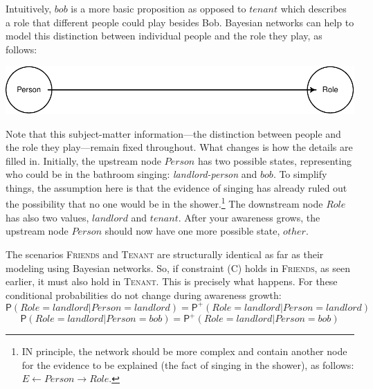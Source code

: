 \documentclass[
  11pt,
  dvipsnames,enabledeprecatedfontcommands]{scrartcl}
\newcommand{\pr}[1]{\ensuremath{\mathsf{P}(#1)}}
\newcommand{\ppr}[2]{\ensuremath{\mathsf{P}^{#1}(#2)}}
\begin{document}
Intuitively, \(bob\) is a more basic proposition as opposed to
\(tenant\) which describes a role that different people could play
besides Bob. Bayesian networks can help to model this distinction
between individual people and the role they play, as follows:

\begin{center}\includegraphics[width=0.5\linewidth,height=0.3\textheight]{ReplyToSteeleStefansson5_files/figure-latex/tenantsDAG-new-1} \end{center}

\noindent Note that this subject-matter information---the distinction
between people and the role they play---remain fixed throughout. What
changes is how the details are filled in. Initially, the upstream node
\(Person\) has two possible states, representing who could be in the
bathroom singing: \textit{landlord-person} and \(bob\). To simplify
things, the assumption here is that the evidence of singing has already
ruled out the possibility that no one would be in the shower.\footnote{IN
  principle, the network should be more complex and contain another node
  for the evidence to be explained (the fact of singing in the shower),
  as follows: \(E\leftarrow\textit{Person}\rightarrow \textit{Role}\).}
The downstream node \(Role\) has also two values, \(landlord\) and
\(tenant\). After your awareness grows, the upstream node \(Person\)
should now have one more possible state, \(other\).

The scenarios \textsc{Friends} and \textsc{Tenant} are structurally
identical as far as their modeling using Bayesian networks. So, if
constraint (C) holds in \textsc{Friends}, as seen earlier, it must also
hold in \textsc{Tenant}. This is precisely what happens. For these
conditional probabilities do not change during awareness growth:
\[\pr{\textit{Role}=\textit{landlord} \vert \textit{Person}=\textit{landlord}}=
\ppr{+}{\textit{Role}=\textit{landlord} \vert \textit{Person}=\textit{landlord}}\]
\[\pr{\textit{Role}=\textit{landlord} \vert \textit{Person}=\textit{bob}}=
\ppr{+}{\textit{Role}=\textit{landlord} \vert \textit{Person}=\textit{bob}}\]
\end{document}
